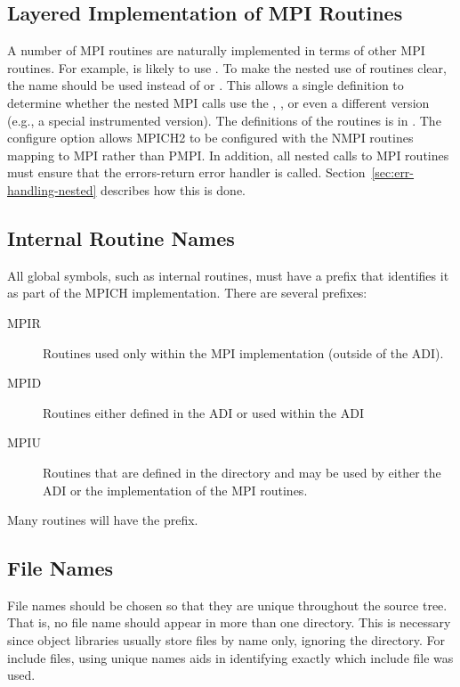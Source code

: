 \documentclass{article}
\begin{document}
\subsection{Layered Implementation of MPI Routines}
\label{sec:layered}
A number of MPI routines are naturally implemented in terms of other
MPI routines.  For example,  is likely to use
.  To make the nested use of routines clear, the
name  should be used instead of  or
.  This allows a single definition to determine whether
the nested MPI calls use the , , or even a
different version (e.g., a special instrumented version).  The
definitions of the  routines is in
.  The configure option
 allows MPICH2 to be configured with
the NMPI routines mapping to MPI rather than PMPI.
In addition, all nested calls to MPI routines must ensure that the
errors-return error handler is called.  
Section~\ref{sec:err-handling-nested} describes how this is done.

\subsection{Internal Routine Names}
\label{sec:routine-names}
All global symbols, such as internal routines, must have a prefix that
identifies it as part of the MPICH implementation.  There are several
prefixes:
\begin{description}
\item[MPIR]Routines used only within the MPI implementation (outside of the
  ADI).
\item[MPID]Routines either defined in the ADI or used within the ADI
\item[MPIU]Routines that are defined in the  directory and
may be used by either the ADI or the implementation of the MPI
routines.
\end{description}
Many routines will have the  prefix.

\subsection{File Names}
\label{sec:mpi-src-filenames}
File names should be chosen so that they are unique throughout the source
tree.  That is, no file name should appear in more than one directory.  
This
is necessary since object libraries usually store files by name only, ignoring
the directory.  For include files, using unique names aids in identifying
exactly which include file was used.
\end{document}
